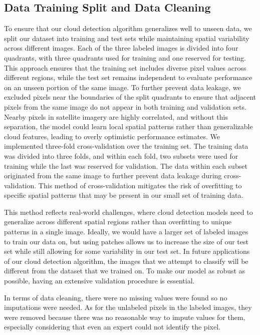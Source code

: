 \documentclass[11pt,letterpaper]{article}
\begin{document}
\subsection{Data Training Split and Data Cleaning}
To ensure that our cloud detection algorithm generalizes well to unseen data, we split our dataset into training and test sets while maintaining spatial variability across different images. Each of the three labeled images is divided into four quadrants, with three quadrants used for training and one reserved for testing. This approach ensures that the training set includes diverse pixel values across different regions, while the test set remains independent to evaluate performance on an unseen portion of the same image. To further prevent data leakage, we excluded pixels near the boundaries of the split quadrants to ensure that adjacent pixels from the same image do not appear in both training and validation sets. Nearby pixels in satellite imagery are highly correlated, and without this separation, the model could learn local spatial patterns rather than generalizable cloud features, leading to overly optimistic performance estimates. We implemented three-fold cross-validation over the training set. The training data was divided into three folds, and within each fold, two subsets were used for training while the last was reserved for validation. The data within each subset originated from the same image to further prevent data leakage during cross-validation. This method of cross-validation mitigates the risk of overfitting to specific spatial patterns that may be present in our small set of training data. 

This method reflects real-world challenges, where cloud detection models need to generalize across different spatial regions rather than overfitting to unique patterns in a single image. Ideally, we would have a larger set of labeled images to train our data on, but using patches allows us to increase the size of our test set while still allowing for some variability in our test set. In future applications of our cloud detection algorithm, the images that we attempt to classify will be different from the dataset that we trained on. To make our model as robust as possible, having an extensive validation procedure is essential. 

In terms of data cleaning, there were no missing values were found so no imputations were needed. As for the unlabeled pixels in the labeled images, they were removed because there was no reasonable way to impute values for them, especially considering that even an expert could not identify the pixel. 
\end{document}
